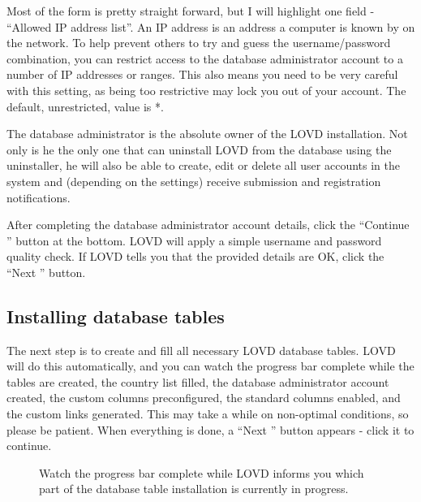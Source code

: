 Most of the form is pretty straight forward, but I will highlight one field - ``Allowed IP address list''.
An IP address is an address a computer is known by on the network.
To help prevent others to try and guess the username/password combination,
you can restrict access to the database administrator account to a number of IP addresses or ranges.
This also means you need to be very careful with this setting, as being too restrictive may lock you out of your account.
The default, unrestricted, value is *.

\begin{infotable}
The database administrator is the absolute owner of the LOVD installation.
Not only is he the only one that can uninstall LOVD from the database using the uninstaller,
he will also be able to create, edit or delete all user accounts in the system and
(depending on the settings) receive submission and registration notifications.
\end{infotable}

After completing the database administrator account details, click the ``Continue \guillemotright'' button at the bottom.
LOVD will apply a simple username and password quality check.
If LOVD tells you that the provided details are OK, click the ``Next \guillemotright'' button.



\subsection{Installing database tables}
The next step is to create and fill all necessary LOVD database tables.
LOVD will do this automatically, and you can watch the progress bar complete while the tables are created,
the country list filled, the database administrator account created, the custom columns preconfigured,
the standard columns enabled, and the custom links generated.
This may take a while on non-optimal conditions, so please be patient.
When everything is done, a ``Next \guillemotright'' button appears - click it to continue.

\begin{figure}[ht]
  \begin{shaded}
  \caption{Watch the progress bar complete while LOVD informs you which part of the database table installation is currently in progress.}
  \end{shaded}
\end{figure}



